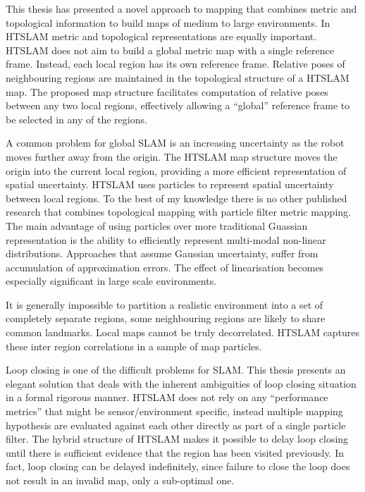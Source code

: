 This thesis has presented a novel approach to mapping that combines
metric and topological information to build maps of medium to large
environments. In HTSLAM metric and topological representations are
equally important. HTSLAM does not aim to build a global metric map
with a single reference frame. Instead, each local region has its own
reference frame. Relative poses of neighbouring regions are maintained
in the topological structure of a HTSLAM map. The proposed map
structure facilitates computation of relative poses between any two
local regions, effectively allowing a ``global'' reference frame to be
selected in any of the regions. 


A common problem for global SLAM is an increasing uncertainty as the
robot moves further away from the origin. The HTSLAM map structure
moves the origin into the current local region, providing a more
efficient representation of spatial uncertainty. HTSLAM uses particles
to represent spatial uncertainty between local regions. To the best of
my knowledge there is no other published research that combines
topological mapping with particle filter metric mapping. The main
advantage of using particles over more traditional Guassian
representation is the ability to efficiently represent multi-modal
non-linear distributions. Approaches that assume Gaussian uncertainty,
suffer from accumulation of approximation errors. The effect of
linearisation becomes especially significant in large scale
environments.


It is generally impossible to partition a realistic environment into a
set of completely separate regions, some neighbouring regions are
likely to share common landmarks. Local maps cannot be truly
decorrelated. HTSLAM captures these inter region correlations in a
sample of map particles.

Loop closing is one of the difficult problems for SLAM. This thesis
presents an elegant solution that deals with the inherent ambiguities
of loop closing situation in a formal rigorous manner. HTSLAM does not
rely on any ``performance metrics'' that might be sensor/environment
specific, instead multiple mapping hypothesis are evaluated against
each other directly as part of a single particle filter. The hybrid
structure of HTSLAM makes it possible to delay loop closing until
there is sufficient evidence that the region has been visited
previously. In fact, loop closing can be delayed indefinitely, since
failure to close the loop does not result in an invalid map, only a
sub-optimal one.

